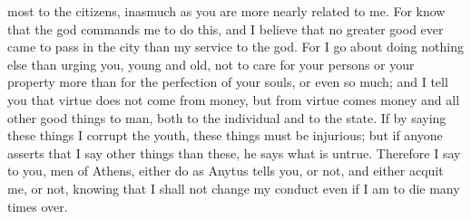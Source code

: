 \documentclass[letterpaper,12pt]{article}
\newcommand{\stephpag}[1]{\marginnote{\small\itshape\fontfamily{ppl}\selectfont #1}}
\begin{document}
most to the citizens, inasmuch as you are more nearly related to me. For know that the god commands me to do this, and I believe that no greater good ever came to pass in the city than my service to the god. For I go about doing nothing else than urging you, young and old, not to care for your persons or your property \stephpag{b} more than for the perfection of your souls, or even so much; and I tell you that virtue does not come from money, but from virtue comes money and all other good things to man, both to the individual and to the state. If by saying these things I corrupt the youth, these things must be injurious; but if anyone asserts that I say other things than these, he says what is untrue. Therefore I say to you, men of Athens, either do as Anytus tells you, or not, and either acquit me, or not, knowing that I shall not change my conduct even if I am \stephpag{c} to die many times over.
\end{document}
